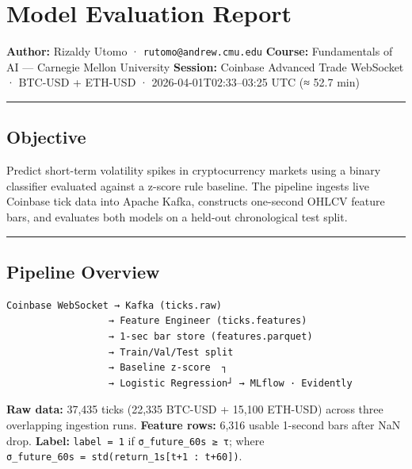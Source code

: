 \documentclass[
]{article}
\author{}
\date{}
\begin{document}
\hypertarget{model-evaluation-report}{%
\section{Model Evaluation Report}\label{model-evaluation-report}}

\textbf{Author:} Rizaldy Utomo · \texttt{rutomo@andrew.cmu.edu}
\textbf{Course:} Fundamentals of AI --- Carnegie Mellon University
\textbf{Session:} Coinbase Advanced Trade WebSocket · BTC-USD + ETH-USD
· 2026-04-01T02:33--03:25 UTC (≈ 52.7 min)

\begin{center}\rule{0.5\linewidth}{0.5pt}\end{center}

\hypertarget{objective}{%
\subsection{Objective}\label{objective}}

Predict short-term volatility spikes in cryptocurrency markets using a
binary classifier evaluated against a z-score rule baseline. The
pipeline ingests live Coinbase tick data into Apache Kafka, constructs
one-second OHLCV feature bars, and evaluates both models on a held-out
chronological test split.

\begin{center}\rule{0.5\linewidth}{0.5pt}\end{center}

\hypertarget{pipeline-overview}{%
\subsection{Pipeline Overview}\label{pipeline-overview}}

\begin{verbatim}
Coinbase WebSocket → Kafka (ticks.raw)
                  → Feature Engineer (ticks.features)
                  → 1-sec bar store (features.parquet)
                  → Train/Val/Test split
                  → Baseline z-score  ┐
                  → Logistic Regression┘ → MLflow · Evidently
\end{verbatim}

\textbf{Raw data:} 37,435 ticks (22,335 BTC-USD + 15,100 ETH-USD) across
three overlapping ingestion runs. \textbf{Feature rows:} 6,316 usable
1-second bars after NaN drop. \textbf{Label:} \texttt{label\ =\ 1} if
\texttt{σ\_future\_60s\ ≥\ τ}; where
\texttt{σ\_future\_60s\ =\ std(return\_1s{[}t+1\ :\ t+60{]})}.
\end{document}
